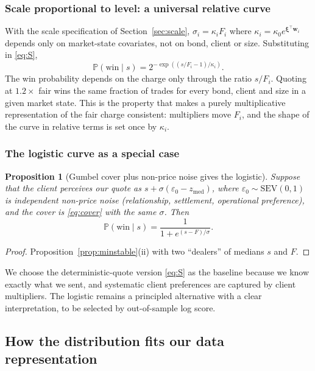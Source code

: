 \documentclass[11pt,a4paper]{article}
\newtheorem{proposition}{Proposition}
\theoremstyle{definition}
\theoremstyle{remark}
\newcommand{\Prob}{\mathbb{P}}
\newcommand{\T}{^{\top}}
\newcommand{\zm}{z_{\mathrm{med}}}
\begin{document}
\subsubsection{Scale proportional to level: a universal relative curve}
With the scale specification of Section~\ref{sec:scale}, $\sigma_i=\kappa_iF_i$ where $\kappa_i=\kappa_0e^{\bm\xi\T\bm w_i}$ depends only on market-state covariates, not on bond, client or size. Substituting in \eqref{eq:S},
\begin{equation}\label{eq:relative}
\Prob(\text{win}\mid s)=2^{-\exp\left((s/F_i-1)/\kappa_i\right)} .
\end{equation}
The win probability depends on the charge only through the ratio $s/F_i$. Quoting at $1.2\times$ fair wins the same fraction of trades for every bond, client and size in a given market state. This is the property that makes a purely multiplicative representation of the fair charge consistent: multipliers move $F_i$, and the shape of the curve in relative terms is set once by $\kappa_i$.

\subsubsection{The logistic curve as a special case}
\begin{proposition}[Gumbel cover plus non-price noise gives the logistic]\label{prop:logistic}
Suppose that the client perceives our quote as $s+\sigma(\varepsilon_0-\zm)$, where $\varepsilon_0\sim\mathrm{SEV}(0,1)$ is independent non-price noise (relationship, settlement, operational preference), and the cover is \eqref{eq:cover} with the same $\sigma$. Then
\[
\Prob(\text{win}\mid s)=\frac{1}{1+e^{(s-F)/\sigma}} .
\]
\end{proposition}
\begin{proof}
Proposition~\ref{prop:minstable}(ii) with two ``dealers'' of medians $s$ and $F$.
\end{proof}
We choose the deterministic-quote version \eqref{eq:S} as the baseline because we know exactly what we sent, and systematic client preferences are captured by client multipliers. The logistic remains a principled alternative with a clear interpretation, to be selected by out-of-sample log score.

\subsection{How the distribution fits our data representation}\label{sec:datamap}
\end{document}
